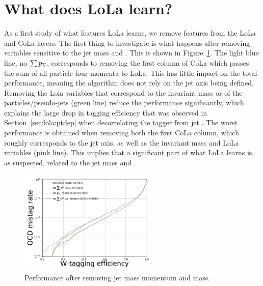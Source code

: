 \section{What does LoLa learn?}
\label{sec:lola:learn}
As a first study of what features LoLa learns, we remove features from the LoLa and CoLa layers. The first thing to investigate is what happens after removing variables sensitive to the jet mass and \PT. This is shown in Figure~\ref{fig:lola:nminus1_masspt}. The light blue line, no $\sum p_{\mathrm{T}}$, corresponds to removing the first column of CoLa which passes the sum of all particle four-momenta to LoLa. This has little impact on the total performance, meaning the algorithm does not rely on the jet axis being defined.
Removing the Lola variables that correspond to the invariant mass or \PT of the particles/pseudo-jets (green line) reduce the performance significantly, which explains the large drop in tagging efficiency that was observed in Section~\ref{sec:lola:ptdep} when decorrelating the tagger from jet \PT. The worst performance is obtained when removing both the first CoLa column, which roughly corresponds to the jet axis, as well as the invariant mass and \PT LoLa variables (pink line). This implies that a significant part of what LoLa learns is, as suspected, related to the jet mass and \PT.
\begin{figure}[h!]
\centering
\includegraphics[width=0.59\textwidth]{figures/vtagging/lola/roc-compare.png}
\caption{Performance after removing jet mass momentum and mass.}
\label{fig:lola:nminus1_masspt}
\end{figure}
